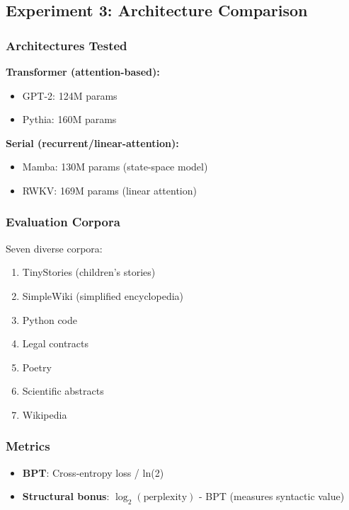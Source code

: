 \documentclass[11pt,a4paper]{article}
\begin{document}
\subsection{Experiment 3: Architecture Comparison}

\subsubsection{Architectures Tested}

\textbf{Transformer (attention-based):}
\begin{itemize}
\item GPT-2: 124M params
\item Pythia: 160M params
\end{itemize}

\textbf{Serial (recurrent/linear-attention):}
\begin{itemize}
\item Mamba: 130M params (state-space model)
\item RWKV: 169M params (linear attention)
\end{itemize}

\subsubsection{Evaluation Corpora}

Seven diverse corpora:
\begin{enumerate}
\item TinyStories (children's stories)
\item SimpleWiki (simplified encyclopedia)
\item Python code
\item Legal contracts
\item Poetry
\item Scientific abstracts
\item Wikipedia
\end{enumerate}

\subsubsection{Metrics}

\begin{itemize}
\item \textbf{BPT}: Cross-entropy loss / ln(2)
\item \textbf{Structural bonus}: $\log_2(\text{perplexity})$ - BPT (measures syntactic value)
\end{itemize}
\end{document}
